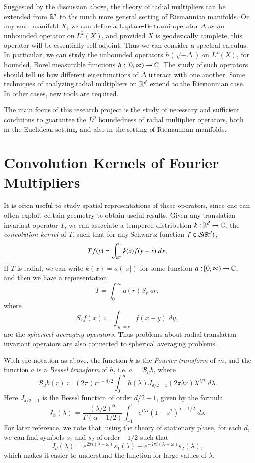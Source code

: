 Suggested by the discussion above, the theory of radial multipliers can be extended from $\operatorname{\mathbb{R}}^d$ to the much more general setting of Riemannian manifolds. On any such manifold $X$, we can define a Laplace-Beltrami operator $\Delta$ as an unbounded operator on $L^2(X)$, and provided $X$ is geodesically complete, this operator will be essentially self-adjoint. Thus we can consider a spectral calculus. In particular, we can study the unbounded operators $h(\sqrt{-\Delta})$ on $L^2(X)$, for bounded, Borel measurable functions $h: [0,\infty) \to \operatorname{\mathbb{C}}$. The study of such operators should tell us how different eigenfunctions of $\Delta$ interact with one another. Some techniques of analyzing radial multipliers on $\operatorname{\mathbb{R}}^d$ extend to the Riemannian case. In other cases, new tools are required.

The main focus of this research project is the study of necessary and sufficient conditions to guarantee the $L^p$ boundedness of radial multiplier operators, both in the Euclidean setting, and also in the setting of Riemannian manifolds. %


\section{Convolution Kernels of Fourier Multipliers}

It is often useful to study spatial representations of these operators, since one can often exploit certain geometry to obtain useful results. Given any translation invariant operator $T$, we can associate a tempered distribution $k: \operatorname{\mathbb{R}}^d \to \operatorname{\mathbb{C}}$, the \emph{convolution kernel} of $T$, such that for any Schwartz function $f \in \mathcal{S}(\operatorname{\mathbb{R}}^d)$,
%
\[ Tf(y) = \int_{\operatorname{\mathbb{R}}^d} k(x) f(y-x)\; dx, \]
%
If $T$ is radial, we can write $k(x) = a(|x|)$ for some function $a: [0,\infty) \to \operatorname{\mathbb{C}}$, and then we have a representation
%
\[ T = \int_0^\infty a(r) S_r\; dr, \]
%
where
%
\[ S_rf(x) \coloneqq \int_{|y| = r} f(x + y)\; dy, \]
%
are the \emph{spherical averaging operators}. Thus problems about radial translation-invariant operators are also connected to spherical averaging problems.

With the notation as above, the function $k$ is the \emph{Fourier transform} of $m$, and the function $a$ is a \emph{Bessel transform} of $h$, i.e. $a = \mathcal{B}_d h$, where
%
\[ \mathcal{B}_d h(r) \coloneqq (2 \pi) r^{1-d/2} \int_0^\infty h(\lambda) J_{d/2 - 1}(2 \pi \lambda r) \lambda^{d/2}\; d\lambda. \]
%
Here $J_{d/2-1}$ is the Bessel function of order $d/2 - 1$, given by the formula
%
\[ J_\alpha(\lambda) \coloneqq \frac{(\lambda / 2)^\alpha}{\Gamma(\alpha + 1/2)} \int_{-1}^1 e^{i \lambda s} (1 - s^2)^{\alpha - 1/2}\; ds. \]
%
For later reference, we note that, using the theory of stationary phase, for each $d$, we can find symbols $s_1$ and $s_2$ of order $-1/2$ such that
%
\[ J_d(\lambda) = e^{2 \pi i (\lambda - \omega)} s_1(\lambda) + e^{-2 \pi i (\lambda - \omega)} s_2(\lambda), \]
%
which makes it easier to understand the function for large values of $\lambda$.

